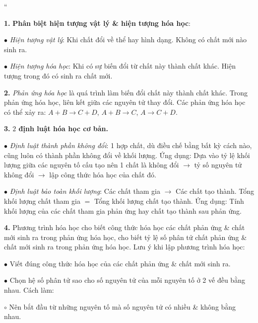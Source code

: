 \documentclass{article}
\numberwithin{equation}{section}
\begin{document}
``\begin{enumerate*}
	\item[\textbf{1.}] \textbf{Phân biệt hiện tượng vật lý \& hiện tượng hóa học}:
	\begin{enumerate*}
		\item[$\bullet$] \textit{Hiện tượng vật lý}: Khi chất đổi về thể hay hình dạng. Không có chất mới nào sinh ra.
		\item[$\bullet$] \textit{Hiện tượng hóa học}: Khi có sự biến đổi từ chất này thành chất khác. Hiện tượng trong đó có sinh ra chất mới.
	\end{enumerate*}
	\item[\textbf{2.}] \textit{Phản ứng hóa học} là quá trình làm biến đổi chất này thành chất khác. Trong phản ứng hóa học, liên kết giữa các nguyên tử thay đổi. Các phản ứng hóa học có thể xảy ra: $A + B\to C + D$, $A + B\to C$, $A\to C + D$.
	\item[\textbf{3.}] \textbf{$2$ định luật hóa học cơ bản.}
	\begin{enumerate*}
		\item[$\bullet$] \textit{Định luật thành phần không đổi}: 1 hợp chất, dù điều chế bằng bất kỳ cách nào, cũng luôn có thành phần không đổi về khối lượng. Ứng dụng: Dựa vào tỷ lệ khối lượng giữa các nguyên tố cấu tạo nên 1 chất là không đổi $\to$ tỷ số nguyên tử không đổi $\to$ lập công thức hóa học của chất đó.
		\item[$\bullet$] \textit{Định luật bảo toàn khối lượng}: Các chất tham gia $\to$ Các chất tạo thành. Tổng khối lượng chất tham gia $=$ Tổng khối lượng chất tạo thành. Ứng dụng: Tính khối lượng của các chất tham gia phản ứng hay chất tạo thành sau phản ứng.
	\end{enumerate*}
	\item[\textbf{4.}] Phương trình hóa học cho biết công thức hóa học các chất phản ứng \& chất mới sinh ra trong phản ứng hóa học, cho biết tỷ lệ số phân tử chất phản ứng \& chất mới sinh ra trong phản ứng hóa học. Lưu ý khi lập phương trình hóa học:
	\begin{enumerate*}
		\item[$\bullet$] Viết đúng công thức hóa học của các chất phản ứng \& chất mới sinh ra.
		\item[$\bullet$] Chọn hệ số phân tử sao cho số nguyên tử của mỗi nguyên tố ở 2 vế đều bằng nhau. Cách làm:
		\begin{enumerate*}
			\item[$\circ$] Nên bắt đầu từ những nguyên tố mà số nguyên tử có nhiều \& không bằng nhau.

\end{enumerate*}
\end{enumerate*}
\end{enumerate*}
\end{document}
